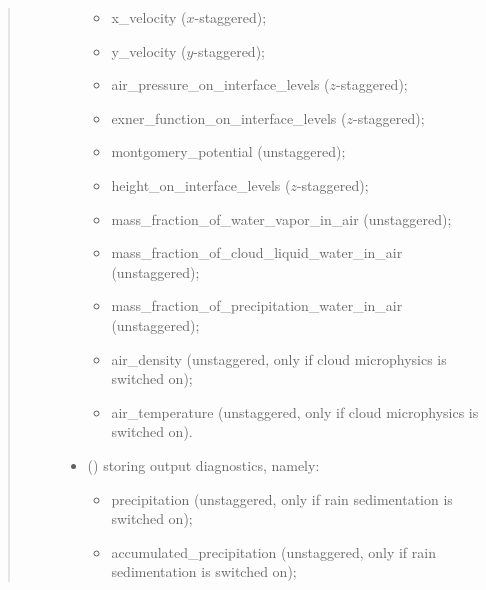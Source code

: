 \documentclass[letterpaper,10pt,english]{sphinxmanual}
\begin{document}
\begin{fulllineitems}
\begin{fulllineitems}
\begin{quote}
\begin{description}
\begin{itemize}
\begin{itemize}
\item {} 
x\_velocity (\(x\)-staggered);

\item {} 
y\_velocity (\(y\)-staggered);

\item {} 
air\_pressure\_on\_interface\_levels (\(z\)-staggered);

\item {} 
exner\_function\_on\_interface\_levels (\(z\)-staggered);

\item {} 
montgomery\_potential (unstaggered);

\item {} 
height\_on\_interface\_levels (\(z\)-staggered);

\item {} 
mass\_fraction\_of\_water\_vapor\_in\_air (unstaggered);

\item {} 
mass\_fraction\_of\_cloud\_liquid\_water\_in\_air (unstaggered);

\item {} 
mass\_fraction\_of\_precipitation\_water\_in\_air (unstaggered);

\item {} 
air\_density (unstaggered, only if cloud microphysics is switched on);

\item {} 
air\_temperature (unstaggered, only if cloud microphysics is switched on).

\end{itemize}

\item {} 
 () \textendash{} {\hyperref[\detokenize{api:tasmania.storages.grid_data.GridData}]{}} storing output diagnostics, namely:
\begin{itemize}
\item {} 
precipitation (unstaggered, only if rain sedimentation is switched on);

\item {} 
accumulated\_precipitation (unstaggered, only if rain sedimentation is switched on);

\end{itemize}

\end{itemize}


\end{description}\end{quote}


\end{fulllineitems}
\end{fulllineitems}
\end{document}
